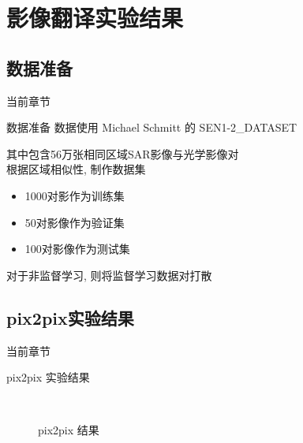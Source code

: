 \section{影像翻译实验结果}

\subsection{数据准备}
\begin{frame}{当前章节}
\end{frame}

\begin{frame}{数据准备}
    数据使用 Michael Schmitt 的 SEN1-2\_DATASET
    
    其中包含56万张相同区域SAR影像与光学影像对\\[0.5cm]

    根据区域相似性, 制作数据集 
    \begin{itemize}
        \item 1000对影作为训练集
        \item 50对影像作为验证集
        \item 100对影像作为测试集
    \end{itemize}
    
    对于非监督学习, 则将监督学习数据对打散
    
    
\end{frame}

\subsection{pix2pix实验结果}

\begin{frame}{当前章节}
\end{frame}

\begin{frame}{pix2pix 实验结果}
    \begin{figure}[!htbp]
        \centering
        \\[0.5cm]
        \label{fig:0101}
        \caption{pix2pix 结果}
    \end{figure}  
\end{frame}

